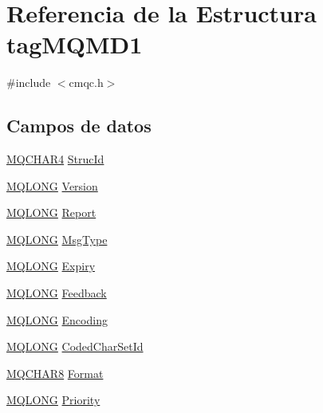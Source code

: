 \hypertarget{structtag_m_q_m_d1}{}\section{Referencia de la Estructura tag\+M\+Q\+M\+D1}
\label{structtag_m_q_m_d1}


{\ttfamily \#include $<$cmqc.\+h$>$}

\subsection*{Campos de datos}
\begin{DoxyCompactItemize}
\item 
\hyperlink{cmqc_8h_a12590e546ed66fda7cf21c1d5cefa31d}{M\+Q\+C\+H\+A\+R4} \hyperlink{structtag_m_q_m_d1_a0530922ca944569b52601d74941f96e4}{Struc\+Id}
\item 
\hyperlink{cmqc_8h_a1fb8d28cbda3fa8766a9821230cdb6d5}{M\+Q\+L\+O\+N\+G} \hyperlink{structtag_m_q_m_d1_a0656ef8f766b3907d394d88a35d7b7e9}{Version}
\item 
\hyperlink{cmqc_8h_a1fb8d28cbda3fa8766a9821230cdb6d5}{M\+Q\+L\+O\+N\+G} \hyperlink{structtag_m_q_m_d1_a3e6ae3e2f087fe6fc26cc75004fbc790}{Report}
\item 
\hyperlink{cmqc_8h_a1fb8d28cbda3fa8766a9821230cdb6d5}{M\+Q\+L\+O\+N\+G} \hyperlink{structtag_m_q_m_d1_a22732037d5385ab03eb3e9d9a5e60843}{Msg\+Type}
\item 
\hyperlink{cmqc_8h_a1fb8d28cbda3fa8766a9821230cdb6d5}{M\+Q\+L\+O\+N\+G} \hyperlink{structtag_m_q_m_d1_a85cb54f2f2a97fe071fcad54d22a92a9}{Expiry}
\item 
\hyperlink{cmqc_8h_a1fb8d28cbda3fa8766a9821230cdb6d5}{M\+Q\+L\+O\+N\+G} \hyperlink{structtag_m_q_m_d1_a9cb2f407eb097aa9cdc246dc18059987}{Feedback}
\item 
\hyperlink{cmqc_8h_a1fb8d28cbda3fa8766a9821230cdb6d5}{M\+Q\+L\+O\+N\+G} \hyperlink{structtag_m_q_m_d1_a30167bf454a49a60fd3fe4e9e586af34}{Encoding}
\item 
\hyperlink{cmqc_8h_a1fb8d28cbda3fa8766a9821230cdb6d5}{M\+Q\+L\+O\+N\+G} \hyperlink{structtag_m_q_m_d1_a4d8d1961a991850d1355cdf9b4680b8e}{Coded\+Char\+Set\+Id}
\item 
\hyperlink{cmqc_8h_abddcedb8c41fa262f2bd05dfec3e60a5}{M\+Q\+C\+H\+A\+R8} \hyperlink{structtag_m_q_m_d1_a435a478822008713f8aaff89f369ed63}{Format}
\item 
\hyperlink{cmqc_8h_a1fb8d28cbda3fa8766a9821230cdb6d5}{M\+Q\+L\+O\+N\+G} \hyperlink{structtag_m_q_m_d1_a72c542b9e2952a489df0cb84755c1fa6}{Priority}

\end{DoxyCompactItemize}
